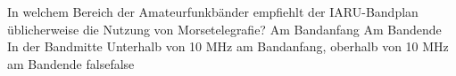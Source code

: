     {In welchem Bereich der Amateurfunkbänder empfiehlt der IARU-Bandplan üblicherweise die Nutzung von Morsetelegrafie?}
    {Am Bandanfang}
    {Am Bandende}
    {In der Bandmitte}
    {Unterhalb von 10 MHz am Bandanfang, oberhalb von 10 MHz am Bandende}
    {false}{false}